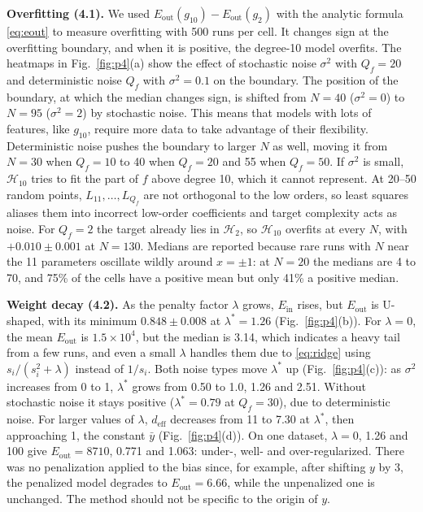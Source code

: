 \documentclass[conference]{IEEEtran}
\newcommand{\Ein}{E_{\mathrm{in}}}
\newcommand{\Eout}{E_{\mathrm{out}}}
\begin{document}
\textbf{Overfitting (4.1).} We used $\Eout(g_{10})-\Eout(g_2)$ with the analytic formula \eqref{eq:eout} to measure overfitting with 500 runs per cell. It changes sign at the overfitting boundary, and when it is positive, the degree-10 model overfits. The heatmaps in Fig.~\ref{fig:p4}(a) show the effect of stochastic noise $\sigma^2$ with $Q_f=20$ and deterministic noise $Q_f$ with $\sigma^2=0.1$ on the boundary. The position of the boundary, at which the median changes sign, is shifted from $N=40$ ($\sigma^2=0$) to $N=95$ ($\sigma^2=2$) by stochastic noise. This means that models with lots of features, like $g_{10}$, require more data to take advantage of their flexibility. Deterministic noise pushes the boundary to larger $N$ as well, moving it from $N=30$ when $Q_f=10$ to 40 when $Q_f=20$ and 55 when $Q_f=50$.
If $\sigma^2$ is small, $\mathcal H_{10}$ tries to fit the part of $f$ above degree 10, which it cannot represent. At 20--50 random points, $L_{11},\dots,L_{Q_f}$ are not orthogonal to the low orders, so least squares aliases them into incorrect low-order coefficients and target complexity acts as noise. For $Q_f=2$ the target already lies in $\mathcal H_2$, so $\mathcal H_{10}$ overfits at every $N$, with $+0.010\pm0.001$ at $N=130$. Medians are reported because rare runs with $N$ near the 11 parameters oscillate wildly around $x=\pm1$: at $N=20$ the medians are 4 to 70, and 75\% of the cells have a positive mean but only 41\% a positive median.

\textbf{Weight decay (4.2).} As the penalty factor $\lambda$ grows, $\Ein$ rises, but $\Eout$ is U-shaped, with its minimum $0.848\pm0.008$ at $\lambda^*=1.26$ (Fig.~\ref{fig:p4}(b)). For $\lambda=0$, the mean $\Eout$ is $1.5\times10^4$, but the median is 3.14, which indicates a heavy tail from a few runs, and even a small $\lambda$ handles them due to \eqref{eq:ridge} using $s_i/(s_i^2+\lambda)$ instead of $1/s_i$.
Both noise types move $\lambda^*$ up (Fig.~\ref{fig:p4}(c)): as $\sigma^2$ increases from 0 to 1, $\lambda^*$ grows from 0.50 to 1.0, 1.26 and 2.51. Without stochastic noise it stays positive ($\lambda^*=0.79$ at $Q_f=30$), due to deterministic noise.
For larger values of $\lambda$, $d_{\mathrm{eff}}$ decreases from 11 to 7.30 at $\lambda^*$, then approaching 1, the constant $\bar y$ (Fig.~\ref{fig:p4}(d)). On one dataset, $\lambda=0$, 1.26 and 100 give $\Eout=8710$, 0.771 and 1.063: under-, well- and over-regularized.
There was no penalization applied to the bias since, for example, after shifting $y$ by 3, the penalized model degrades to $\Eout=6.66$, while the unpenalized one is unchanged. The method should not be specific to the origin of $y$.
\end{document}
